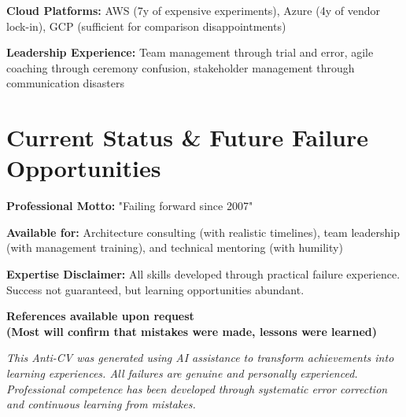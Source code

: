 \documentclass[10pt,a4paper]{article}
\begin{document}
\textbf{Cloud Platforms:} AWS (7y of expensive experiments), Azure (4y of vendor lock-in), GCP (sufficient for comparison disappointments)

\textbf{Leadership Experience:} Team management through trial and error, agile coaching through ceremony confusion, stakeholder management through communication disasters

\section{Current Status \& Future Failure Opportunities}

\textbf{Professional Motto:} "Failing forward since 2007"

\textbf{Available for:} Architecture consulting (with realistic timelines), team leadership (with management training), and technical mentoring (with humility)

\textbf{Expertise Disclaimer:} All skills developed through practical failure experience. Success not guaranteed, but learning opportunities abundant.

\vspace{12pt}
\begin{center}
\textbf{\color{failred}References available upon request}\\
\textbf{\color{lessonblue}(Most will confirm that mistakes were made, lessons were learned)}
\end{center}

\vspace{6pt}
{\scriptsize\color{gray}\textit{This Anti-CV was generated using AI assistance to transform achievements into learning experiences. All failures are genuine and personally experienced. Professional competence has been developed through systematic error correction and continuous learning from mistakes.}}
\end{document}
